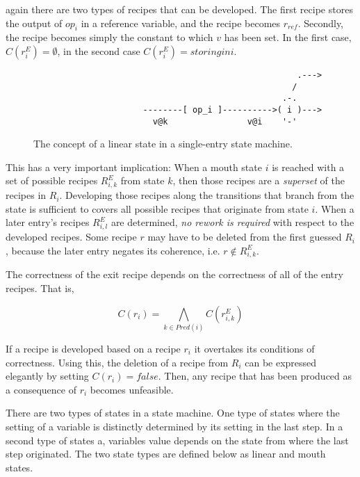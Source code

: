 \documentclass[12pt,a4paper]{scrartcl}
\begin{document}
again there are two types of recipes that can be developed. The first recipe stores
the output of $op_i$ in a reference variable, and the recipe becomes $r_{ref}$.
Secondly, the recipe becomes simply the constant to which $v$ has been set.
In the first case, $C(r^E_i)=\emptyset$, in the second case $C(r^E_i)=storing in i$.


\begin{figure}[htbp] \leavevmode \label{fig:linear-state}
\begin{verbatim}
                                                     .---> 
                                                    /
                                                  .-.
                      --------[ op_i ]---------->( i )---> 
                        v@k                v@i    '-'

\end{verbatim}
\caption{The concept of a linear state in a single-entry state machine.}
\end{figure}



This has a very important implication: When a mouth state $i$ is reached with a
set of possible recipes $R^E_{i,k}$ from state $k$, then those recipes are a
\textit{superset} of the recipes in $R_i$. Developing those recipes along the
transitions that branch from the state is sufficient to covers all possible
recipes that originate from state $i$.  When a later entry's recipes
$R^E_{i,l}$ are determined, \textit{no rework is required} with respect to the
developed recipes.  Some recipe $r$ may have to be deleted from the first
guessed $R_i$, because the later entry negates its coherence, i.e. $r \notin
R^E_{i,k}$.

The correctness of the exit recipe depends on the correctness of all of the
entry recipes. That is, 

\begin{equation}
    C(r_i) = \bigwedge_{k\in Pred(i)} C(r^E_{i,k})
\end{equation}

If a recipe is developed based on a recipe $r_i$ it overtakes its conditions of
correctness. Using this, the deletion of a recipe from $R_i$ can be expressed
elegantly by setting $C(r_i)=false$. Then, any recipe that has been produced
as a consequence of $r_i$ becomes unfeasible. 



There are two types of states in a state machine. One type of states where the
setting of a variable is distinctly determined by its setting in the last step.
In a second type of states a, variables value depends on the state from where the
last step originated.  The two state types are defined below as linear and
mouth states.
\end{document}
